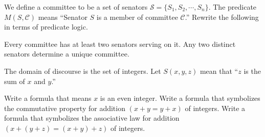 \documentclass[solution, letterpaper]{cs20inclass}
\begin{document}
\problem
We define a committee to be a set of senators $\mathcal{S} = \{S_1,S_2,\cdots,S_n\}$. The predicate $M(S,\mathcal{C})$ means ``Senator $S$ is a member of committee $\mathcal{C}$.'' Rewrite the following in terms of predicate logic.

\subproblem Every committee has at least two senators serving on it.
\subproblem Any two distinct senators determine a unique committee. 

\begin{solution}
\end{solution}

\problem The domain of discourse is the set of integers. Let $S(x, y, z)$ mean that ``$z$ is the sum of $x$ and $y$.''

\subproblem Write a formula that means $x$ is an even integer. 
\subproblem Write a formula that symbolizes the commutative property for addition $(x+y = y +x)$ of integers.
\subproblem Write a formula that symbolizes the associative law for addition\\ $(x + (y + z) = (x + y) + z)$ of integers.

\begin{solution}
\end{solution}
\end{document}
